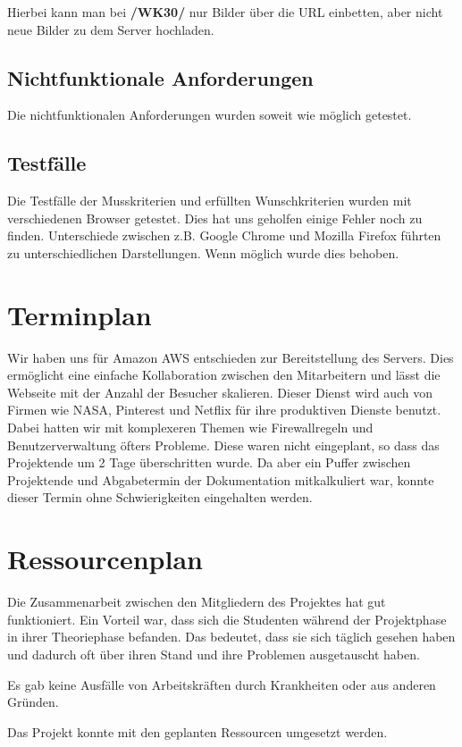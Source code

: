 \documentclass{article}
\begin{document}
\noindent Hierbei kann man bei \textbf{/WK30/} nur Bilder über die URL einbetten, aber nicht neue Bilder zu dem Server hochladen.

\subsection{Nichtfunktionale Anforderungen}
Die nichtfunktionalen Anforderungen wurden soweit wie möglich getestet.

\subsection{Testfälle}
Die Testfälle der Musskriterien und erfüllten Wunschkriterien wurden mit verschiedenen Browser getestet. Dies hat uns geholfen einige Fehler noch zu finden. Unterschiede zwischen z.B. Google Chrome und Mozilla Firefox führten zu unterschiedlichen Darstellungen. Wenn möglich wurde dies behoben.

\section{Terminplan}
Wir haben uns für Amazon AWS entschieden zur Bereitstellung des Servers. Dies ermöglicht eine einfache Kollaboration zwischen den Mitarbeitern und lässt die Webseite mit der Anzahl der Besucher skalieren. Dieser Dienst wird auch von Firmen wie NASA, Pinterest und Netflix für ihre produktiven Dienste benutzt. Dabei hatten wir mit komplexeren Themen wie Firewallregeln und Benutzerverwaltung öfters Probleme. Diese waren nicht eingeplant, so dass das Projektende um 2 Tage überschritten wurde. Da aber ein Puffer zwischen Projektende und Abgabetermin der Dokumentation mitkalkuliert war, konnte dieser Termin ohne Schwierigkeiten eingehalten werden.


\section{Ressourcenplan}
Die Zusammenarbeit zwischen den Mitgliedern des Projektes hat gut funktioniert. Ein Vorteil war, dass sich die Studenten während der Projektphase in ihrer Theoriephase befanden. Das bedeutet, dass sie sich täglich gesehen haben und dadurch oft über ihren Stand und ihre Problemen ausgetauscht haben.

\smallskip
\noindent Es gab keine Ausfälle von Arbeitskräften durch Krankheiten oder aus anderen Gründen.

\smallskip
\noindent Das Projekt konnte mit den geplanten Ressourcen umgesetzt werden.
\end{document}
